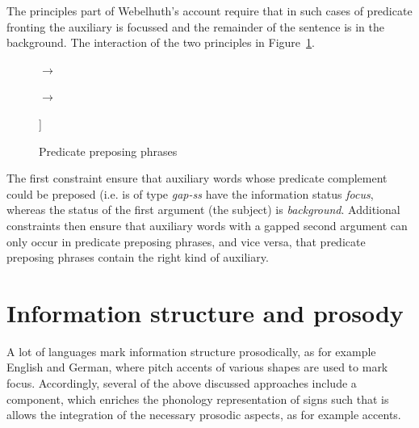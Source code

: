 \documentclass[output=paper]{langsci/langscibook}
\begin{document}
The principles part of Webelhuth's account require that in such cases
of predicate fronting the auxiliary is focussed and the remainder of
the sentence is in the background. The interaction of the two
principles in Figure~\ref{fig:predicatepreposing}.
\begin{figure}[htb]
  \centering
  \begin{avm}
  \end{avm}
$\to$\ 
\begin{avm}
\end{avm}

\bigskip
\begin{avm}
$\to$\ 
\begin{avm}
  [\textit{hd-fill-ph}\\
    non-hd-dtr & [ss|status & bg]]
\end{avm}
  
\end{avm}
  \caption{Predicate preposing phrases}
  \label{fig:predicatepreposing}
\end{figure}
The first constraint ensure that auxiliary words whose predicate
complement could be preposed (i.e. is of type \textit{gap-ss} have the
information status \textit{focus}, whereas the status of the first
argument (the subject) is \textit{background}. Additional constraints
then ensure that auxiliary words with a gapped second argument can
only occur in predicate preposing phrases, and vice versa, that
predicate preposing phrases contain the right kind of auxiliary.

\section{Information structure and prosody}
\label{sec:prosody}
A lot of languages mark information structure prosodically, as for
example English and German, where pitch accents of various shapes are
used to mark focus. Accordingly, several of the above discussed
approaches include a component, which enriches the phonology representation
of signs such that is allows the integration of the necessary prosodic
aspects, as for example accents.
\end{document}
